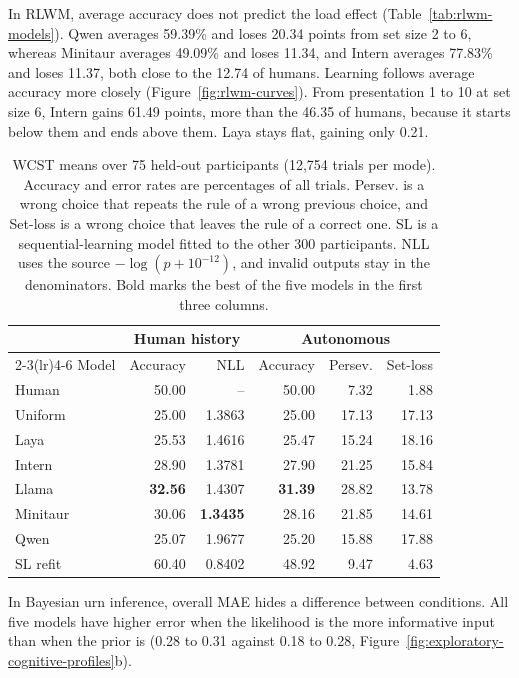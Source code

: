 \documentclass[11pt,a4paper]{article}
\begin{document}
In RLWM, average accuracy does not predict the load effect (Table~\ref{tab:rlwm-models}). Qwen averages 59.39\% and loses 20.34 points from set size 2 to 6, whereas Minitaur averages 49.09\% and loses 11.34, and Intern averages 77.83\% and loses 11.37, both close to the 12.74 of humans. Learning follows average accuracy more closely (Figure~\ref{fig:rlwm-curves}). From presentation 1 to 10 at set size 6, Intern gains 61.49 points, more than the 46.35 of humans, because it starts below them and ends above them. Laya stays flat, gaining only 0.21.

\begin{table}[!h]
\centering\footnotesize
\setlength{\tabcolsep}{3pt}
\begin{tabular}{@{}lrrrrr@{}}
\toprule
 & \multicolumn{2}{c}{Human history} & \multicolumn{3}{c}{Autonomous} \\
\cmidrule(lr){2-3}\cmidrule(lr){4-6}
Model & Accuracy & NLL & Accuracy & Persev. & Set-loss \\
\midrule
\rowcolor{tablegray} Human & 50.00 & -- & 50.00 & 7.32 & 1.88 \\
\rowcolor{tablegray} Uniform & 25.00 & 1.3863 & 25.00 & 17.13 & 17.13 \\
Laya & 25.53 & 1.4616 & 25.47 & 15.24 & 18.16 \\
Intern & 28.90 & 1.3781 & 27.90 & 21.25 & 15.84 \\
Llama & \textbf{32.56} & 1.4307 & \textbf{31.39} & 28.82 & 13.78 \\
Minitaur & 30.06 & \textbf{1.3435} & 28.16 & 21.85 & 14.61 \\
Qwen & 25.07 & 1.9677 & 25.20 & 15.88 & 17.88 \\
\rowcolor{tablegray} SL refit & 60.40 & 0.8402 & 48.92 & 9.47 & 4.63 \\
\bottomrule
\end{tabular}
\caption{WCST means over 75 held-out participants (12,754 trials per mode). Accuracy and error rates are percentages of all trials. Persev. is a wrong choice that repeats the rule of a wrong previous choice, and Set-loss is a wrong choice that leaves the rule of a correct one. SL is a sequential-learning model fitted to the other 300 participants. NLL uses the source $-\log(p+10^{-12})$, and invalid outputs stay in the denominators. Bold marks the best of the five models in the first three columns.}
\label{tab:wcst}
\end{table}


In Bayesian urn inference, overall MAE hides a difference between conditions. All five models have higher error when the likelihood is the more informative input than when the prior is (0.28 to 0.31 against 0.18 to 0.28, Figure~\ref{fig:exploratory-cognitive-profiles}b).
\end{document}

